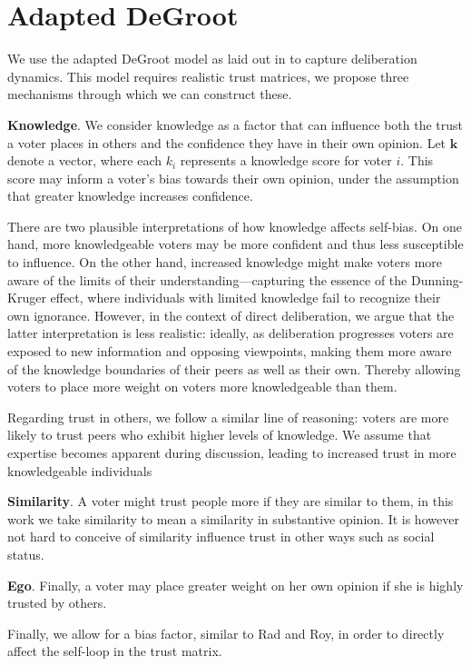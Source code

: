 \section{Adapted DeGroot}
We use the adapted DeGroot model as laid out in  to capture deliberation dynamics. This model requires realistic trust matrices, we propose three mechanisms through which we can construct these.


\textbf{Knowledge}. We consider knowledge as a factor that can influence both the trust a voter places in others and the confidence they have in their own opinion. Let $\boldsymbol{k}$ denote a vector, where each $k_i$ represents a knowledge score for voter $i$. This score may inform a voter's bias towards their own opinion, under the assumption that greater knowledge increases confidence.

There are two plausible interpretations of how knowledge affects self-bias. On
one hand, more knowledgeable voters may be more confident and thus less
susceptible to influence. On the other hand, increased knowledge might make
voters more aware of the limits of their understanding—capturing the essence of
the Dunning-Kruger effect, where individuals with limited knowledge fail to
recognize their own ignorance. However, in the context of direct deliberation,
we argue that the latter interpretation is less realistic: ideally, as
deliberation progresses voters are exposed to new information and opposing
viewpoints, making them more aware of the knowledge boundaries of their peers
as well as their own. Thereby allowing voters to place more weight on voters
more knowledgeable than them.

Regarding trust in others, we follow a similar line of reasoning: voters are
more likely to trust peers who exhibit higher levels of knowledge. We assume
that expertise becomes apparent during discussion, leading to increased
trust in more knowledgeable individuals


\textbf{Similarity}. A voter might trust people more if they are similar to them, in this work we take similarity to mean a similarity in substantive opinion. It is however not hard to conceive of similarity influence trust in other ways such as social status.


\textbf{Ego}. Finally, a voter may place greater weight on her own opinion if
she is highly trusted by others.

Finally, we allow for a bias factor, similar to Rad and Roy, in order to
directly affect the self-loop in the trust matrix.

